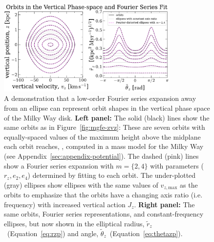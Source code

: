 \documentclass[modern]{aastex631}
\newcommand{\rz}{\ensuremath{r_z}}
\newcommand{\rzp}{\ensuremath{\tilde{r}_z}}
\newcommand{\thzp}{\ensuremath{\tilde{\theta}_z}}
\begin{document}
\begin{figure}[t!]
\begin{center}
\includegraphics[width=0.8\textwidth]{simulated-orbits-fourier.pdf}
\end{center}
\caption{%
A demonstration that a low-order Fourier series expansion away from an ellipse can
represent orbit shapes in the vertical phase space of the Milky Way disk.
\textbf{Left panel:} The solid (black) lines show the same orbits as in
Figure~\ref{fig:mgfe-zvz}: These are seven orbits with equally-spaced values of the
maximum height above the midplane each orbit reaches, \zmax, computed in a mass model
for the Milky Way (see Appendix~\ref{sec:appendix-potential}).
The dashed (pink) lines show a Fourier series expansion with $m=\{2, 4\}$ with
parameters ($\rz, e_2, e_4$) determined by fitting to each orbit.
The under-plotted (gray) ellipses show ellipses with the same values of $v_{z,
\textrm{max}}$ as the orbits to emphasize that the orbits have a changing axis ratio
(i.e. frequency) with increased vertical action $J_z$.
\textbf{Right panel:} The same orbits, Fourier series representations, and
constant-frequency ellipses, but now shown in the elliptical radius, \rzp\
(Equation~\ref{eq:rzp}) and angle, \thzp\ (Equation~\ref{eq:thetazp}).
\label{fig:fourier-contours}
}
\end{figure}
\end{document}
